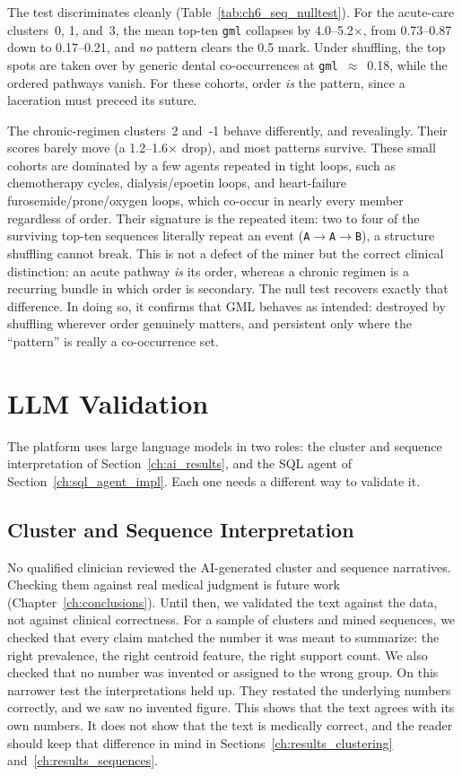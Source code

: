 The test discriminates cleanly (Table~\ref{tab:ch6_seq_nulltest}). For the acute-care clusters~0, 1, and~3, the mean top-ten \texttt{gml} collapses by 4.0--5.2$\times$, from 0.73--0.87 down to 0.17--0.21, and \emph{no} pattern clears the 0.5 mark. Under shuffling, the top spots are taken over by generic dental co-occurrences at \texttt{gml}~$\approx$~0.18, while the ordered pathways vanish. For these cohorts, order \emph{is} the pattern, since a laceration must preceed its suture.

The chronic-regimen clusters~2 and~-1 behave differently, and revealingly. Their scores barely move (a 1.2--1.6$\times$ drop), and most patterns survive. These small cohorts are dominated by a few agents repeated in tight loops, such as chemotherapy cycles, dialysis/epoetin loops, and heart-failure furosemide/prone/oxygen loops, which co-occur in nearly every member regardless of order. Their signature is the repeated item: two to four of the surviving top-ten sequences literally repeat an event (\texttt{A$\to$A$\to$B}), a structure shuffling cannot break. This is not a defect of the miner but the correct clinical distinction: an acute pathway \emph{is} its order, whereas a chronic regimen is a recurring bundle in which order is secondary. The null test recovers exactly that difference. In doing so, it confirms that GML behaves as intended: destroyed by shuffling wherever order genuinely matters, and persistent only where the ``pattern'' is really a co-occurrence set.

\section{LLM Validation}
\label{ch:llm_validation}

The platform uses large language models in two roles: the cluster and sequence interpretation of Section~\ref{ch:ai_results}, and the SQL agent of Section~\ref{ch:sql_agent_impl}. Each one needs a different way to validate it.

\subsection{Cluster and Sequence Interpretation}

No qualified clinician reviewed the AI-generated cluster and sequence narratives. Checking them against real medical judgment is future work (Chapter~\ref{ch:conclusions}). Until then, we validated the text against the data, not against clinical correctness. For a sample of clusters and mined sequences, we checked that every claim matched the number it was meant to summarize: the right prevalence, the right centroid feature, the right support count. We also checked that no number was invented or assigned to the wrong group. On this narrower test the interpretations held up. They restated the underlying numbers correctly, and we saw no invented figure. This shows that the text agrees with its own numbers. It does not show that the text is medically correct, and the reader should keep that difference in mind in Sections~\ref{ch:results_clustering} and~\ref{ch:results_sequences}.

